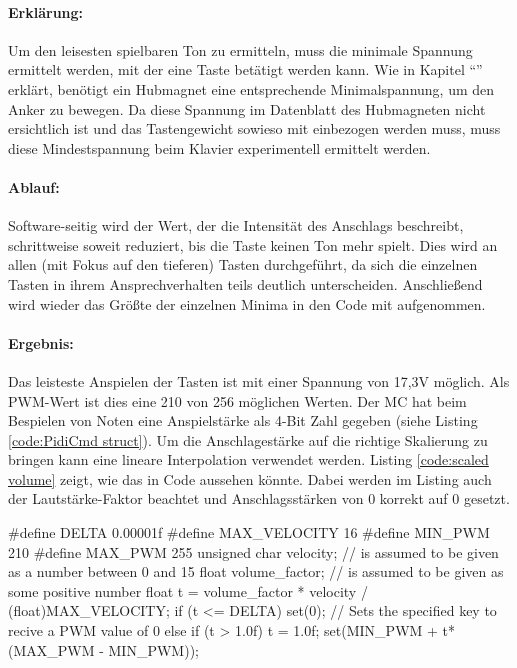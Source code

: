 \paragraph{Erklärung:}
Um den leisesten spielbaren Ton zu ermitteln, muss die minimale Spannung ermittelt werden, mit der eine Taste betätigt werden kann.
Wie in Kapitel \enquote{} erklärt, benötigt ein Hubmagnet eine entsprechende Minimalspannung, um den Anker zu bewegen.
Da diese Spannung im Datenblatt des Hubmagneten nicht ersichtlich ist und das Tastengewicht sowieso mit einbezogen werden muss, muss diese Mindestspannung beim Klavier experimentell ermittelt werden.

\paragraph{Ablauf:}
Software-seitig wird der Wert, der die Intensität des Anschlags beschreibt, schrittweise soweit reduziert, bis die Taste keinen Ton mehr spielt.
Dies wird an allen (mit Fokus auf den tieferen) Tasten durchgeführt, da sich die einzelnen Tasten in ihrem Ansprechverhalten teils deutlich unterscheiden. %
Anschließend wird wieder das Größte der einzelnen Minima in den Code mit aufgenommen.

\paragraph{Ergebnis:}
Das leisteste Anspielen der Tasten ist mit einer Spannung von 17,3V möglich.
Als \ac{PWM}-Wert ist dies eine 210 von 256 möglichen Werten.
Der \ac{MC} hat beim Bespielen von Noten eine Anspielstärke als 4-Bit Zahl gegeben (siehe Listing \ref{code:PidiCmd struct}).
Um die Anschlagestärke auf die richtige Skalierung zu bringen kann eine lineare Interpolation verwendet werden.
Listing \ref{code:scaled volume} zeigt, wie das in Code aussehen könnte.
Dabei werden im Listing auch der Lautstärke-Faktor beachtet und Anschlagsstärken von 0 korrekt auf 0 gesetzt.

\begin{UnbrokenCodePage}[style=CStyle, caption={Skalierung der Lautstärke bei der Ausgabe}, label={code:scaled volume}]
#define DELTA 0.00001f
#define MAX_VELOCITY 16
#define MIN_PWM 210
#define MAX_PWM 255
unsigned char velocity; // is assumed to be given as a number between 0 and 15
float volume_factor;    // is assumed to be given as some positive number
float t = volume_factor * velocity / (float)MAX_VELOCITY;
if (t <= DELTA) {
	set(0); // Sets the specified key to recive a PWM value of 0
} else {
	if (t > 1.0f) t = 1.0f;
	set(MIN_PWM + t*(MAX_PWM - MIN_PWM));
}
\end{UnbrokenCodePage}


